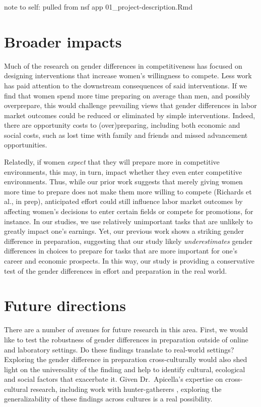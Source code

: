 \documentclass[a4paper, nobind]{templates/ociamthesis}
\begin{document}
note to self: pulled from nsf app 01\_project-description.Rmd

\hypertarget{broader-impacts}{%
\chapter{Broader impacts}\label{broader-impacts}}

Much of the research on gender differences in competitiveness has focused on designing interventions that increase women's willingness to compete. Less work has paid attention to the downstream consequences of said interventions. If we find that women spend more time preparing on average than men, and possibly overprepare, this would challenge prevailing views that gender differences in labor market outcomes could be reduced or eliminated by simple interventions. Indeed, there are opportunity costs to (over)preparing, including both economic and social costs, such as lost time with family and friends and missed advancement opportunities.

Relatedly, if women \emph{expect} that they will prepare more in competitive environments, this may, in turn, impact whether they even enter competitive environments. Thus, while our prior work suggests that merely giving women more time to prepare does not make them more willing to compete (Richards et al., in prep), anticipated effort could still influence labor market outcomes by affecting women's decisions to enter certain fields or compete for promotions, for instance. In our studies, we use relatively unimportant tasks that are unlikely to greatly impact one's earnings. Yet, our previous work shows a striking gender difference in preparation, suggesting that our study likely \emph{underestimates} gender differences in choices to prepare for tasks that are more important for one's career and economic prospects. In this way, our study is providing a conservative test of the gender differences in effort and preparation in the real world.

\hypertarget{future-directions}{%
\chapter{Future directions}\label{future-directions}}

There are a number of avenues for future research in this area. First, we would like to test the robustness of gender differences in preparation outside of online and laboratory settings. Do these findings translate to real-world settings? Exploring the gender difference in preparation cross-culturally would also shed light on the universality of the finding and help to identify cultural, ecological and social factors that exacerbate it. Given Dr.~Apicella's expertise on cross-cultural research, including work with hunter-gatherers \autocite{Apicella2014a,Apicella2012,Apicella2017,Apicella2015,Apicella2009,Apicella2015a,Apicella2018,Apicella2007,Apicella2014,Apicella2016,Apicella2018a,Apicella2007a}, exploring the generalizability of these findings across cultures is a real possibility.
\end{document}
